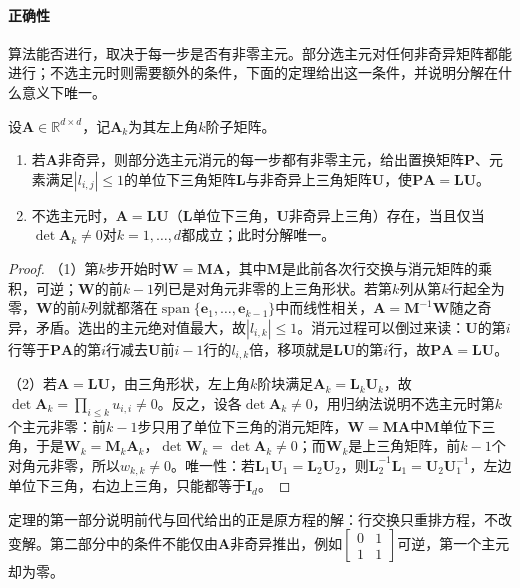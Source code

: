 \paragraph{正确性}
算法能否进行，取决于每一步是否有非零主元。部分选主元对任何非奇异矩阵都能进行；不选主元时则需要额外的条件，下面的定理给出这一条件，并说明分解在什么意义下唯一。

\begin{theorem}[LU分解的存在与唯一]
\label{thm:ls-lu-existence}
设$\bm A\in\mathbb R^{d\times d}$，记$\bm A_k$为其左上角$k$阶子矩阵。
\begin{enumerate}
 \item 若$\bm A$非奇异，则部分选主元消元的每一步都有非零主元，给出置换矩阵$\bm P$、元素满足$|l_{i,j}|\leq1$的单位下三角矩阵$\bm L$与非奇异上三角矩阵$\bm U$，使$\bm P\bm A=\bm L\bm U$。
 \item 不选主元时，$\bm A=\bm L\bm U$（$\bm L$单位下三角，$\bm U$非奇异上三角）存在，当且仅当$\det\bm A_k\neq0$对$k=1,\ldots,d$都成立；此时分解唯一。
\end{enumerate}
\end{theorem}
\begin{proof}
（1）第$k$步开始时$\bm W=\bm M\bm A$，其中$\bm M$是此前各次行交换与消元矩阵的乘积，可逆；$\bm W$的前$k-1$列已是对角元非零的上三角形状。若第$k$列从第$k$行起全为零，$\bm W$的前$k$列就都落在$\operatorname{span}\{\bm e_1,\ldots,\bm e_{k-1}\}$中而线性相关，$\bm A=\bm M^{-1}\bm W$随之奇异，矛盾。选出的主元绝对值最大，故$|l_{i,k}|\leq1$。消元过程可以倒过来读：$\bm U$的第$i$行等于$\bm P\bm A$的第$i$行减去$\bm U$前$i-1$行的$l_{i,k}$倍，移项就是$\bm L\bm U$的第$i$行，故$\bm P\bm A=\bm L\bm U$。

（2）若$\bm A=\bm L\bm U$，由三角形状，左上角$k$阶块满足$\bm A_k=\bm L_k\bm U_k$，故$\det\bm A_k=\prod_{i\leq k}u_{i,i}\neq0$。反之，设各$\det\bm A_k\neq0$，用归纳法说明不选主元时第$k$个主元非零：前$k-1$步只用了单位下三角的消元矩阵，$\bm W=\bm M\bm A$中$\bm M$单位下三角，于是$\bm W_k=\bm M_k\bm A_k$，$\det\bm W_k=\det\bm A_k\neq0$；而$\bm W_k$是上三角矩阵，前$k-1$个对角元非零，所以$w_{k,k}\neq0$。唯一性：若$\bm L_1\bm U_1=\bm L_2\bm U_2$，则$\bm L_2^{-1}\bm L_1=\bm U_2\bm U_1^{-1}$，左边单位下三角，右边上三角，只能都等于$\bm I_d$。
\end{proof}

定理的第一部分说明前代与回代给出的正是原方程的解：行交换只重排方程，不改变解。第二部分中的条件不能仅由$\bm A$非奇异推出，例如$\left[\begin{smallmatrix}0&1\\1&1\end{smallmatrix}\right]$可逆，第一个主元却为零。

